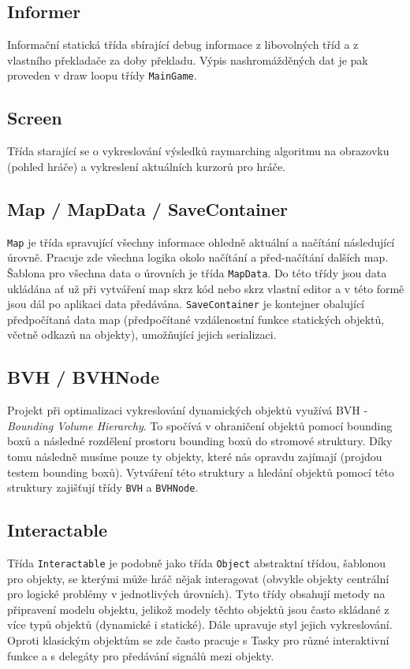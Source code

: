 \documentclass[a4paper, 12pt]{article}
\begin{document}
\subsection{Informer}
Informační statická třída sbírající debug informace z libovolných tříd a z
vlastního překladače za doby překladu. Výpis nashromážděných dat je pak
proveden v draw loopu třídy \texttt{MainGame}.

\subsection{Screen}
Třída starající se o vykreslování výsledků raymarching algoritmu na obrazovku
(pohled hráče) a vykreslení aktuálních kurzorů pro hráče.

\subsection{Map / MapData / SaveContainer}
\texttt{Map} je třída spravující všechny informace ohledně aktuální a načítání
následující úrovně. Pracuje zde všechna logika okolo načítání a před-načítání
dalších map. Šablona pro všechna data o úrovních je třída \texttt{MapData}. Do
této třídy jsou data ukládána ať už při vytváření map skrz kód nebo skrz
vlastní editor a v této formě jsou dál po aplikaci data předávána.
\texttt{SaveContainer} je kontejner obalující předpočítaná data map
(předpočítané vzdálenostní funkce statických objektů, včetně odkazů na
objekty), umožňující jejich serializaci.

\subsection{BVH / BVHNode}
Projekt při optimalizaci vykreslování dynamických objektů využívá BVH -
\emph{Bounding Volume Hierarchy}. To spočívá v ohraničení objektů pomocí
bounding boxů a následné rozdělení prostoru bounding boxů do stromové
struktury. Díky tomu následně musíme pouze ty objekty, které nás opravdu
zajímají (projdou testem bounding boxů). Vytváření této struktury a hledání
objektů pomocí této struktury zajišťují třídy \texttt{BVH} a \texttt{BVHNode}.

\subsection{Interactable}
Třída \texttt{Interactable} je podobně jako třída \texttt{Object} abstraktní
třídou, šablonou pro objekty, se kterými může hráč nějak interagovat (obvykle
objekty centrální pro logické problémy v jednotlivých úrovních). Tyto třídy
obsahují metody na připravení modelu objektu, jelikož modely těchto objektů
jsou často skládané z více typů objektů (dynamické i statické). Dále upravuje
styl jejich vykreslování. Oproti klasickým objektům se zde často pracuje s
Tasky pro různé interaktivní funkce a s delegáty pro předávání signálů mezi
objekty.
\end{document}
